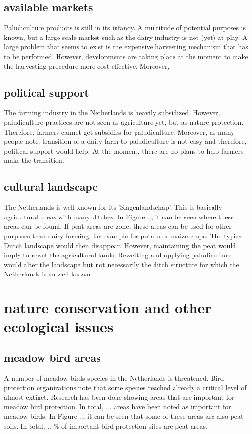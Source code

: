 \documentclass[a4paper,12pt]{scrbook}
\begin{document}
\subsection{available markets}
Paludiculture products is still in its infancy. A multitude of potential purposes is known, but a large scale market such as the dairy industry is not (yet) at play. A large problem that seems to exist is the expensive harvesting mechanism that has to  be performed. However, developments are taking place at the moment to make the harvesting procedure more cost-effective. Moreover, 


\subsection{political support}  
The farming industry in the Netherlands is heavily subsidized. However, paludiculture practices are not seen as agriculture yet, but as nature protection. Therefore, farmers cannot get subsidies for paludiculture. Moreover, as many people note, transition of a dairy farm to paludiculture is not easy and therefore, political support would help. At the moment, there are no plans to help farmers make the transition.

\subsection{cultural landscape}
The Netherlands is well known for its 'Slagenlandschap'. This is basically agricultural areas with many ditches. In Figure .., it can be seen where these areas can be found. If peat areas are gone, these areas can be used for other purposes than dairy farming, for example for potato or maize crops. The typical Dutch landscape would then disappear. However, maintaining the peat would imply to rewet the agricultural lands. Rewetting and applying paludiculture would alter the landscape but not necessarily the ditch structure for which the Netherlands is so well known. 

\section{nature conservation and other ecological issues}

\subsection{meadow bird areas}
A number of meadow birds species in the Netherlands is threatened. Bird protection organizations note that some species reached already a critical level of almost extinct. Research has been done showing areas that are important for meadow bird protection. In total, ... areas have been noted as important for meadow birds. In Figure .., it can be seen that some of these areas are also peat soils. In total, .. \% of important bird protection sites are peat areas. 
\end{document}
